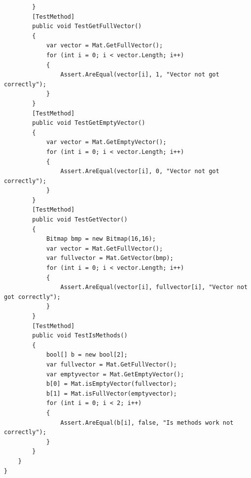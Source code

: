 \documentclass[14pt,a4paper]{extreport}
\begin{document}
\begin{verbatim}
        }
        [TestMethod]
        public void TestGetFullVector() 
        {
            var vector = Mat.GetFullVector();
            for (int i = 0; i < vector.Length; i++)
            {
                Assert.AreEqual(vector[i], 1, "Vector not got correctly");
            }
        }
        [TestMethod]
        public void TestGetEmptyVector()
        {
            var vector = Mat.GetEmptyVector();
            for (int i = 0; i < vector.Length; i++)
            {
                Assert.AreEqual(vector[i], 0, "Vector not got correctly");
            }
        }
        [TestMethod]
        public void TestGetVector()
        {
            Bitmap bmp = new Bitmap(16,16);
            var vector = Mat.GetFullVector();
            var fullvector = Mat.GetVector(bmp);
            for (int i = 0; i < vector.Length; i++)
            {
                Assert.AreEqual(vector[i], fullvector[i], "Vector not got correctly");
            }
        }
        [TestMethod]
        public void TestIsMethods() 
        {
            bool[] b = new bool[2];
            var fullvector = Mat.GetFullVector();
            var emptyvector = Mat.GetEmptyVector();
            b[0] = Mat.isEmptyVector(fullvector);
            b[1] = Mat.isFullVector(emptyvector);
            for (int i = 0; i < 2; i++)
            {
                Assert.AreEqual(b[i], false, "Is methods work not correctly");
            }
        }
    }
}
	\end{verbatim}
\end{document}
